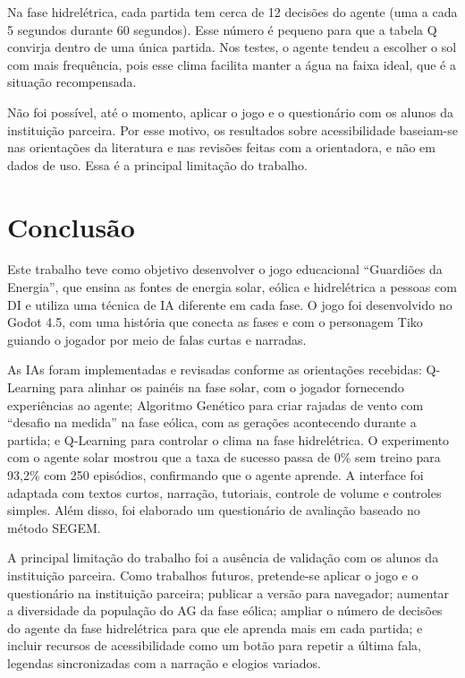 \documentclass[12pt,a4paper]{article}
\begin{document}
Na fase hidrelétrica, cada partida tem cerca de 12 decisões do agente (uma a cada 5 segundos durante 60 segundos). Esse número é pequeno para que a tabela Q convirja dentro de uma única partida. Nos testes, o agente tendeu a escolher o sol com mais frequência, pois esse clima facilita manter a água na faixa ideal, que é a situação recompensada.

Não foi possível, até o momento, aplicar o jogo e o questionário com os alunos da instituição parceira. Por esse motivo, os resultados sobre acessibilidade baseiam-se nas orientações da literatura e nas revisões feitas com a orientadora, e não em dados de uso. Essa é a principal limitação do trabalho.

\section{Conclusão}

Este trabalho teve como objetivo desenvolver o jogo educacional ``Guardiões da Energia'', que ensina as fontes de energia solar, eólica e hidrelétrica a pessoas com DI e utiliza uma técnica de IA diferente em cada fase. O jogo foi desenvolvido no Godot 4.5, com uma história que conecta as fases e com o personagem Tiko guiando o jogador por meio de falas curtas e narradas.

As IAs foram implementadas e revisadas conforme as orientações recebidas: Q-Learning para alinhar os painéis na fase solar, com o jogador fornecendo experiências ao agente; Algoritmo Genético para criar rajadas de vento com ``desafio na medida'' na fase eólica, com as gerações acontecendo durante a partida; e Q-Learning para controlar o clima na fase hidrelétrica. O experimento com o agente solar mostrou que a taxa de sucesso passa de 0\% sem treino para 93,2\% com 250 episódios, confirmando que o agente aprende. A interface foi adaptada com textos curtos, narração, tutoriais, controle de volume e controles simples. Além disso, foi elaborado um questionário de avaliação baseado no método SEGEM.

A principal limitação do trabalho foi a ausência de validação com os alunos da instituição parceira. Como trabalhos futuros, pretende-se aplicar o jogo e o questionário na instituição parceira; publicar a versão para navegador; aumentar a diversidade da população do AG da fase eólica; ampliar o número de decisões do agente da fase hidrelétrica para que ele aprenda mais em cada partida; e incluir recursos de acessibilidade como um botão para repetir a última fala, legendas sincronizadas com a narração e elogios variados.
\end{document}

